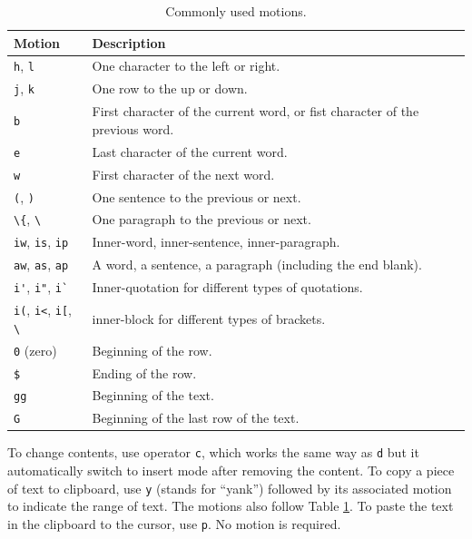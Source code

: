 \begin{table}[!htb]
  \centering \caption{Commonly used motions.}\label{ch:tfe:tab:motion}
  \begin{tabularx}{\textwidth}{lX}
    \hline
    Motion & Description \\ \hline
    \verb|h|, \verb|l| & One character to the left or right. \\ 
    \verb|j|, \verb|k| & One row to the up or down. \\ 
    \verb|b| & First character of the current word, or fist character of the previous word. \\ 
    \verb|e| & Last character of the current word. \\ 
    \verb|w| & First character of the next word. \\ 
    \verb|(|, \verb|)| & One sentence to the previous or next. \\ 
    \lstinline{\{}, \lstinline{\}} & One paragraph to the previous or next. \\ 
    \verb|iw|, \verb|is|, \verb|ip| & Inner-word, inner-sentence, inner-paragraph. \\ 
    \verb|aw|, \verb|as|, \verb|ap| & A word, a sentence, a paragraph (including the end blank). \\ 
    \verb|i'|, \verb|i"|, \verb|i`| & Inner-quotation for different types of quotations. \\ 
    \verb|i(|, \verb|i<|, \verb|i[|, \lstinline{\}} & inner-block for different types of brackets. \\ 
    \verb|0| (zero) & Beginning of the row. \\ 
    \verb|$| & Ending of the row. \\ 
    \verb|gg| & Beginning of the text. \\ 
    \verb|G| & Beginning of the last row of the text. \\
    \hline
  \end{tabularx}
\end{table}

To change contents, use operator \verb|c|, which works the same way as \verb|d| but it automatically switch to insert mode after removing the content. To copy a piece of text to clipboard, use \verb|y| (stands for ``yank'') followed by its associated motion to indicate the range of text. The motions also follow Table \ref{ch:tfe:tab:motion}. To paste the text in the clipboard to the cursor, use \verb|p|. No motion is required.


